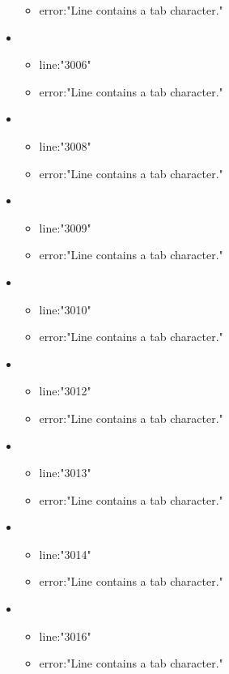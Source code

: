 \begin{itemize}
\begin{itemize}
		\item error:"Line contains a tab character." 
	\end{itemize}
	\item 
	\begin{itemize} 
		\item line:"3006" 
		\item error:"Line contains a tab character." 
	\end{itemize}
	\item 
	\begin{itemize} 
		\item line:"3008" 
		\item error:"Line contains a tab character." 
	\end{itemize}
	\item 
	\begin{itemize} 
		\item line:"3009" 
		\item error:"Line contains a tab character." 
	\end{itemize}
	\item 
	\begin{itemize} 
		\item line:"3010" 
		\item error:"Line contains a tab character." 
	\end{itemize}
	\item 
	\begin{itemize} 
		\item line:"3012" 
		\item error:"Line contains a tab character." 
	\end{itemize}
	\item 
	\begin{itemize} 
		\item line:"3013" 
		\item error:"Line contains a tab character." 
	\end{itemize}
	\item 
	\begin{itemize} 
		\item line:"3014" 
		\item error:"Line contains a tab character." 
	\end{itemize}
	\item 
	\begin{itemize} 
		\item line:"3016" 
		\item error:"Line contains a tab character." 
	\end{itemize}

\end{itemize}
